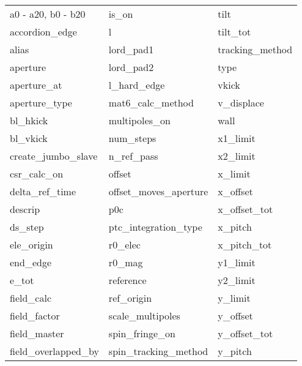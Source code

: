  \begin{tabular}{lll} \toprule
a0 - a20, b0 - b20          & is_on                       & tilt                        \\
accordion_edge              & l                           & tilt_tot                    \\
alias                       & lord_pad1                   & tracking_method             \\
aperture                    & lord_pad2                   & type                        \\
aperture_at                 & l_hard_edge                 & vkick                       \\
aperture_type               & mat6_calc_method            & v_displace                  \\
bl_hkick                    & multipoles_on               & wall                        \\
bl_vkick                    & num_steps                   & x1_limit                    \\
create_jumbo_slave          & n_ref_pass                  & x2_limit                    \\
csr_calc_on                 & offset                      & x_limit                     \\
delta_ref_time              & offset_moves_aperture       & x_offset                    \\
descrip                     & p0c                         & x_offset_tot                \\
ds_step                     & ptc_integration_type        & x_pitch                     \\
ele_origin                  & r0_elec                     & x_pitch_tot                 \\
end_edge                    & r0_mag                      & y1_limit                    \\
e_tot                       & reference                   & y2_limit                    \\
field_calc                  & ref_origin                  & y_limit                     \\
field_factor                & scale_multipoles            & y_offset                    \\
field_master                & spin_fringe_on              & y_offset_tot                \\
field_overlapped_by         & spin_tracking_method        & y_pitch                     \\

\end{tabular}
